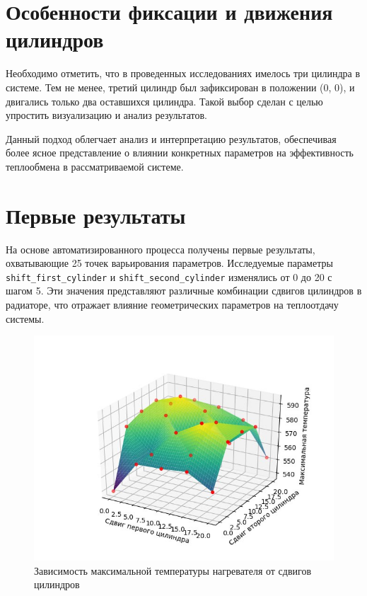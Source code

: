\documentclass[a4paper,12pt]{article}
\theoremstyle{plain} %
\theoremstyle{definition} %
\theoremstyle{remark} %
\begin{document}
\section{Особенности фиксации и движения цилиндров}

Необходимо отметить, что в проведенных исследованиях имелось три цилиндра в системе. Тем не менее, третий цилиндр был зафиксирован в положении (0, 0), и двигались только два оставшихся цилиндра. Такой выбор сделан с целью упростить визуализацию и анализ результатов.

Данный подход облегчает анализ и интерпретацию результатов, обеспечивая более ясное представление о влиянии конкретных параметров на эффективность теплообмена в рассматриваемой системе.

\section{Первые результаты}

На основе автоматизированного процесса получены первые результаты, охватывающие 25 точек варьирования параметров. Исследуемые параметры \texttt{shift\_first\_cylinder} и \texttt{shift\_second\_cylinder} изменялись от 0 до 20 с шагом 5. Эти значения представляют различные комбинации сдвигов цилиндров в радиаторе, что отражает влияние геометрических параметров на теплоотдачу системы.

\begin{figure}[h]
	\begin{center}
		\includegraphics[width=0.4\linewidth]{images/16.1.jpg}
		\caption{Зависимость максимальной температуры нагревателя от сдвигов цилиндров} %
	\end{center}
\end{figure}
\end{document}
